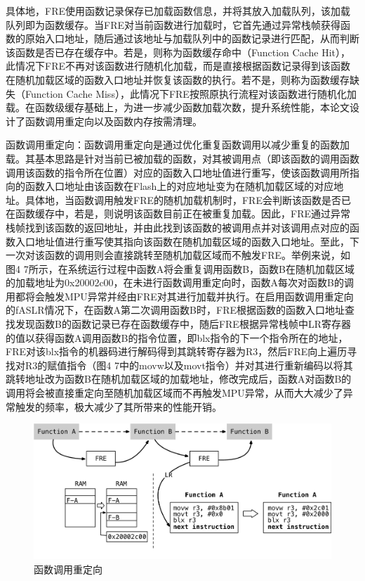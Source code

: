 \documentclass[12pt,a4paper]{ctexart}
\numberwithin{figure}{section}
\begin{document}
\par 具体地，FRE使用函数记录保存已加载函数信息，并将其放入加载队列，该加载队列即为函数缓存。当FRE对当前函数进行加载时，它首先通过异常栈帧获得函数的原始入口地址，随后通过该地址与加载队列中的函数记录进行匹配，从而判断该函数是否已存在缓存中。若是，则称为函数缓存命中（Function Cache Hit），此情况下FRE不再对该函数进行随机化加载，而是直接根据函数记录得到该函数在随机加载区域的函数入口地址并恢复该函数的执行。若不是，则称为函数缓存缺失（Function Cache Miss），此情况下FRE按照原执行流程对该函数进行随机化加载。在函数级缓存基础上，为进一步减少函数加载次数，提升系统性能，本论文设计了函数调用重定向以及函数内存按需清理。
\par 函数调用重定向：函数调用重定向是通过优化重复函数调用以减少重复的函数加载。其基本思路是针对当前已被加载的函数，对其被调用点（即该函数的调用函数调用该函数的指令所在位置）对应的函数入口地址值进行重写，使该函数调用所指向的函数入口地址由该函数在Flash上的对应地址变为在随机加载区域的对应地址。具体地，当函数调用触发FRE的随机加载机制时，FRE会判断该函数是否已在函数缓存中，若是，则说明该函数目前正在被重复加载。因此，FRE通过异常栈帧找到该函数的返回地址，并由此找到该函数的被调用点并对该调用点对应的函数入口地址值进行重写使其指向该函数在随机加载区域的函数入口地址。至此，下一次对该函数的调用则会直接跳转至随机加载区域而不触发FRE。举例来说，如图4 7所示，在系统运行过程中函数A将会重复调用函数B，函数B在随机加载区域的加载地址为0x20002c00，在未进行函数调用重定向时，函数A每次对函数B的调用都将会触发MPU异常并经由FRE对其进行加载并执行。在启用函数调用重定向的fASLR情况下，在函数A第二次调用函数B时，FRE根据函数的函数入口地址查找发现函数B的函数记录已存在函数缓存中，随后FRE根据异常栈帧中LR寄存器的值以获得函数A调用函数B的指令位置，即blx指令的下一个指令所在的地址，FRE对该blx指令的机器码进行解码得到其跳转寄存器为R3，然后FRE向上遍历寻找对R3的赋值指令（图4 7中的movw以及movt指令）并对其进行重新编码以将其跳转地址改为函数B在随机加载区域的加载地址，修改完成后，函数A对函数B的调用将会被直接重定向至随机加载区域而不再触发MPU异常，从而大大减少了异常触发的频率，极大减少了其所带来的性能开销。
\begin{figure}[h]
    \centering
    \includegraphics[scale=0.5]{graph/redirection.png}
    \caption{函数调用重定向}
\end{figure}
\end{document}
